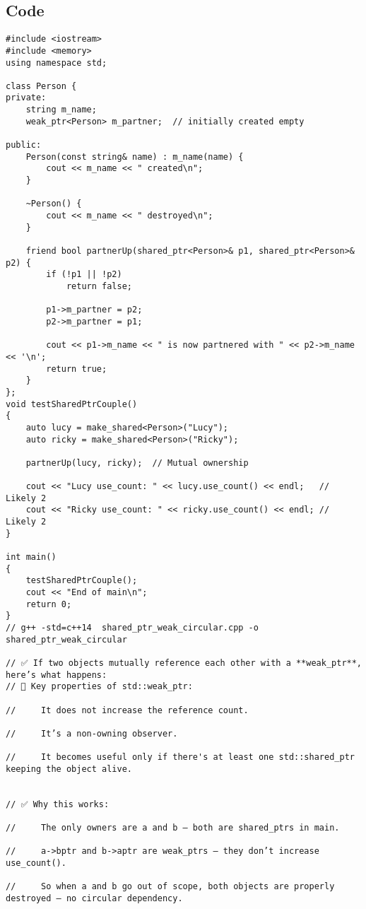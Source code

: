 \documentclass[12pt]{article}
\begin{document}
\subsection*{Code}
\begin{Verbatim}[fontsize=\small,frame=single]
#include <iostream>
#include <memory>
using namespace std;

class Person {
private:
    string m_name;
    weak_ptr<Person> m_partner;  // initially created empty

public:
    Person(const string& name) : m_name(name) {
        cout << m_name << " created\n";
    }

    ~Person() {
        cout << m_name << " destroyed\n";
    }

    friend bool partnerUp(shared_ptr<Person>& p1, shared_ptr<Person>& p2) {
        if (!p1 || !p2)
            return false;

        p1->m_partner = p2;
        p2->m_partner = p1;

        cout << p1->m_name << " is now partnered with " << p2->m_name << '\n';
        return true;
    }
};
void testSharedPtrCouple()
{
    auto lucy = make_shared<Person>("Lucy");
    auto ricky = make_shared<Person>("Ricky");

    partnerUp(lucy, ricky);  // Mutual ownership

    cout << "Lucy use_count: " << lucy.use_count() << endl;   // Likely 2
    cout << "Ricky use_count: " << ricky.use_count() << endl; // Likely 2
}

int main()
{
    testSharedPtrCouple();
    cout << "End of main\n";
    return 0;
}
// g++ -std=c++14  shared_ptr_weak_circular.cpp -o shared_ptr_weak_circular

// ✅ If two objects mutually reference each other with a **weak_ptr**, here’s what happens:
// 📌 Key properties of std::weak_ptr:

//     It does not increase the reference count.

//     It’s a non-owning observer.

//     It becomes useful only if there's at least one std::shared_ptr keeping the object alive.


// ✅ Why this works:

//     The only owners are a and b — both are shared_ptrs in main.

//     a->bptr and b->aptr are weak_ptrs — they don’t increase use_count().

//     So when a and b go out of scope, both objects are properly destroyed — no circular dependency.


\end{Verbatim}
\end{document}

